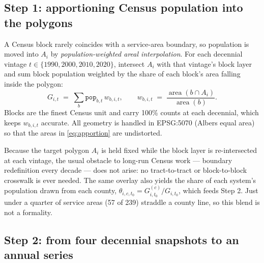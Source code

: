 \documentclass[11pt]{article}
\begin{document}
\subsection{Step 1: apportioning Census population into the polygons}
\label{sec:apportion}

A Census block rarely coincides with a service-area boundary, so population is
moved into $A_i$ by \emph{population-weighted areal interpolation}. For each
decennial vintage $t\in\{1990,2000,2010,2020\}$, intersect $A_i$ with that
vintage's block layer and sum block population weighted by the share of each
block's area falling inside the polygon:
\begin{equation}
G_{i,t} \;=\; \sum_{b} \texttt{pop}_{b,t}\, w_{b,i,t},
\qquad
w_{b,i,t} \;=\;
  \frac{\operatorname{area}\!\left(b \cap A_i\right)}{\operatorname{area}(b)} .
\label{eq:apportion}
\end{equation}
Blocks are the finest Census unit and carry 100\% counts at each decennial,
which keeps $w_{b,i,t}$ accurate. All geometry is handled in EPSG:5070 (Albers
equal area) so that the areas in \eqref{eq:apportion} are undistorted.

Because the target polygon $A_i$ is held fixed while the block layer is
re-intersected at each vintage, the usual obstacle to long-run Census
work --- boundary redefinition every decade --- does not arise: no
tract-to-tract or block-to-block crosswalk is ever needed. The same overlay
also yields the share of each system's population drawn from each county,
$\theta_{i,c,t_0} = G_{i,t_0}^{(c)} / G_{i,t_0}$, which feeds Step 2. Just
under a quarter of service areas (57 of 239) straddle a county line, so this
blend is not a formality.

\subsection{Step 2: from four decennial snapshots to an annual series}
\label{sec:cadence}
\end{document}
